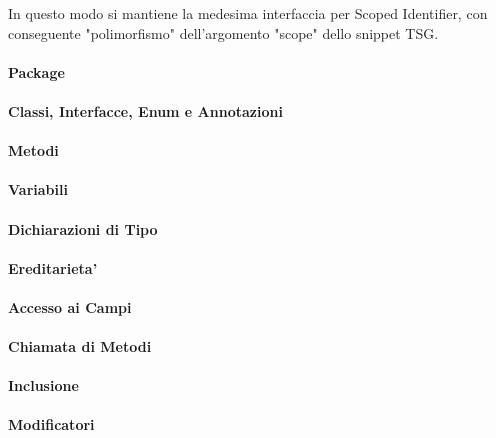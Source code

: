 
In questo modo si mantiene la medesima interfaccia per Scoped Identifier, con conseguente "polimorfismo" dell'argomento "scope" dello snippet TSG.

\paragraph{Package}

\paragraph{Classi, Interfacce, Enum e Annotazioni}

\paragraph{Metodi}

\paragraph{Variabili}

\paragraph{Dichiarazioni di Tipo}

\paragraph{Ereditarieta'}

\paragraph{Accesso ai Campi}

\paragraph{Chiamata di Metodi}

\paragraph{Inclusione}

\paragraph{Modificatori}
